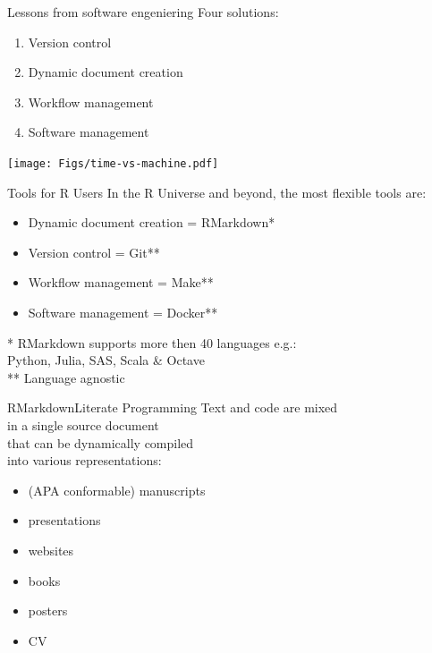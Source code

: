 \documentclass[12pt,t]{beamer}
\begin{document}
{\begin{frame}[c]{Lessons from software engeniering}
Four solutions:
  \begin{enumerate}
    \item \textcolor{vhilit}{Version control}
    \item \textcolor{vhilit}{Dynamic document creation}
    \item \textcolor{hilit}{Workflow management}
    \item \textcolor{hilit}{Software management}
  \end{enumerate}
  \hfill \texttt{[image: Figs/time-vs-machine.pdf]}

\end{frame}

\begin{frame}[c]{Tools for R Users}
	In the R Universe and beyond, the most flexible tools are:
  \begin{itemize}
    \item Dynamic document creation = RMarkdown*
    \item Version control = Git**
    \item Workflow management = Make**
    \item Software management = Docker**
  \end{itemize}
  \vfill
  \textcolor{lolit}{
	* RMarkdown supports more then 40 languages e.g.:\\
	\hspace{10mm}Python, Julia, SAS, Scala \& Octave\\
	** Language agnostic
	}
\end{frame}

\begin{frame}[c]{RMarkdown\textemdash{}Literate Programming}
  Text and code are mixed\\
  in a single source document\\
  that can be \textcolor{hilit}{dynamically} compiled\\
  into various representations:
  \begin{itemize}
    \item (APA conformable) manuscripts
    \item presentations
    \item websites
    \item books
    \item posters
		\item CV
  \end{itemize}
\end{frame}

}
\end{document}
